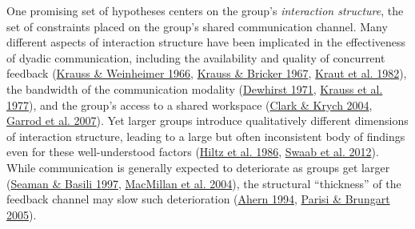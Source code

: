 \documentclass[
  english,
]{article}
\begin{document}
One promising set of hypotheses centers on the group's \emph{interaction structure}, the set of constraints placed on the group's shared communication channel.
Many different aspects of interaction structure have been implicated in the effectiveness of dyadic communication, including the availability and quality of concurrent feedback (\protect\hyperlink{ref-krauss1966}{Krauss \& Weinheimer 1966}, \protect\hyperlink{ref-KraussBricker67_Delay}{Krauss \& Bricker 1967}, \protect\hyperlink{ref-kraut1982listener}{Kraut et al. 1982}), the bandwidth of the communication modality (\protect\hyperlink{ref-dewhirst1971influence}{Dewhirst 1971}, \protect\hyperlink{ref-KraussEtAl77}{Krauss et al. 1977}), and the group's access to a shared workspace (\protect\hyperlink{ref-clark2004speaking}{Clark \& Krych 2004}, \protect\hyperlink{ref-garrod2007foundations}{Garrod et al. 2007}).
Yet larger groups introduce qualitatively different dimensions of interaction structure, leading to a large but often inconsistent body of findings even for these well-understood factors (\protect\hyperlink{ref-hiltz1986experiments}{Hiltz et al. 1986}, \protect\hyperlink{ref-swaab2012communication}{Swaab et al. 2012}).
While communication is generally expected to deteriorate as groups get larger (\protect\hyperlink{ref-seaman1997communication}{Seaman \& Basili 1997}, \protect\hyperlink{ref-macmillan_communication_2004}{MacMillan et al. 2004}), the structural ``thickness'' of the feedback channel may slow such deterioration (\protect\hyperlink{ref-ahern1994effect}{Ahern 1994}, \protect\hyperlink{ref-parisi2005evaluating}{Parisi \& Brungart 2005}).
\end{document}
